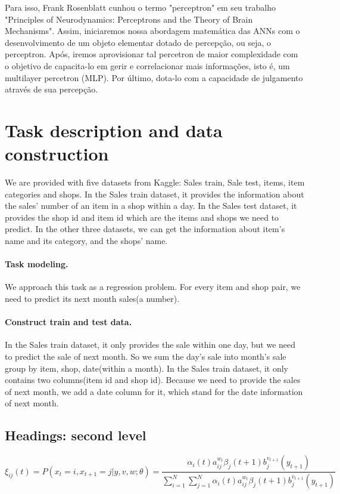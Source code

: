 \documentclass{article}
\begin{document}
Para isso, Frank Rosenblatt cunhou o termo "perceptron" em seu trabalho "Principles of Neurodynamics: Perceptrons and the Theory of Brain Mechanisms". Assim, iniciaremos nossa abordagem matemática das ANNs com o desenvolvimento de um objeto elementar dotado de percepção, ou seja, o perceptron. Após, iremos aprovisionar tal percetron de maior complexidade com o objetivo de capacita-lo em gerir e correlacionar mais informações, isto é, um multilayer percetron (MLP). Por último, dota-lo com a capacidade de julgamento através de sua percepção. 



\section{Task description and data construction}
\label{sec:headings}
We are provided with five datasets from Kaggle: Sales train, Sale test, items, item categories and shops. In the Sales train dataset, it provides the information about the sales’ number of an item in a shop within a day. In the Sales test dataset, it provides the shop id and item id which are the items and shops we need to predict. In the other three datasets, we can get the information about item’s name and its category, and the shops’ name.
\paragraph{Task modeling.}
We approach this task as a regression problem. For every item and shop pair, we need to predict its next month sales(a number).
\paragraph{Construct train and test data.}
In the Sales train dataset, it only provides the sale within one day, but we need to predict the sale of next month. So we sum the day's sale into month's sale group by item, shop, date(within a month).
In the Sales train dataset, it only contains two columns(item id and shop id). Because we need to provide the sales of next month, we add a date column for it, which stand for the date information of next month.

\subsection{Headings: second level}
\lipsum[5]
\begin{equation}
  \xi _{ij}(t)=P(x_{t}=i,x_{t+1}=j|y,v,w;\theta)= {\frac {\alpha _{i}(t)a^{w_t}_{ij}\beta _{j}(t+1)b^{v_{t+1}}_{j}(y_{t+1})}{\sum _{i=1}^{N} \sum _{j=1}^{N} \alpha _{i}(t)a^{w_t}_{ij}\beta _{j}(t+1)b^{v_{t+1}}_{j}(y_{t+1})}}
\end{equation}
\end{document}
